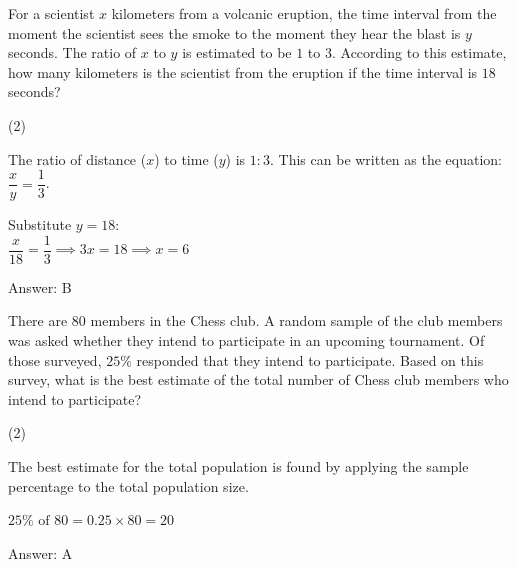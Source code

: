 \documentclass[11pt,paper=a4,answers]{exam}
\begin{document}
\begin{questions}
\vspace{1cm}

\question
For a scientist $x$ kilometers from a volcanic eruption, the time interval from the moment the scientist sees the smoke to the moment they hear the blast is $y$ seconds. The ratio of $x$ to $y$ is estimated to be $1$ to $3$. According to this estimate, how many kilometers is the scientist from the eruption if the time interval is $18$ seconds?
\begin{tasks}(2)
\end{tasks}

\begin{solution}
The ratio of distance ($x$) to time ($y$) is $1:3$. This can be written as the equation: $\dfrac{x}{y} = \dfrac{1}{3}$.
\vspace{5pt}
\begin{center}
Substitute $y = 18$: \\
$\dfrac{x}{18} = \dfrac{1}{3} \implies 3x = 18 \implies x = 6$
\end{center}
\vspace{5pt}
Answer: \colorbox{yellow!100}{B}
\end{solution}

\vspace{1cm}

\question
There are $80$ members in the Chess club. A random sample of the club members was asked whether they intend to participate in an upcoming tournament. Of those surveyed, $25\%$ responded that they intend to participate. Based on this survey, what is the best estimate of the total number of Chess club members who intend to participate?
\begin{tasks}(2)
\end{tasks}

\begin{solution}
The best estimate for the total population is found by applying the sample percentage to the total population size.
\vspace{5pt}
\begin{center}
$25\% \text{ of } 80 = 0.25 \times 80 = 20$
\end{center}
\vspace{5pt}
Answer: \colorbox{yellow!100}{A}
\end{solution}

\vspace{1cm}


\end{questions}
\end{document}
